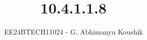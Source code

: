 \documentclass[journal]{IEEEtran}
\begin{document}

\vspace{3cm}

\title{10.4.1.1.8}
\author{EE24BTECH11024 - G. Abhimanyu Koushik}
 \maketitle
{\let\newpage\relax\maketitle}

\renewcommand{\thefigure}{\theenumi}
\renewcommand{\thetable}{\theenumi}
\setlength{\intextsep}{10pt} %


\renewcommand{\thetable}{\theenumi}
\end{document}
